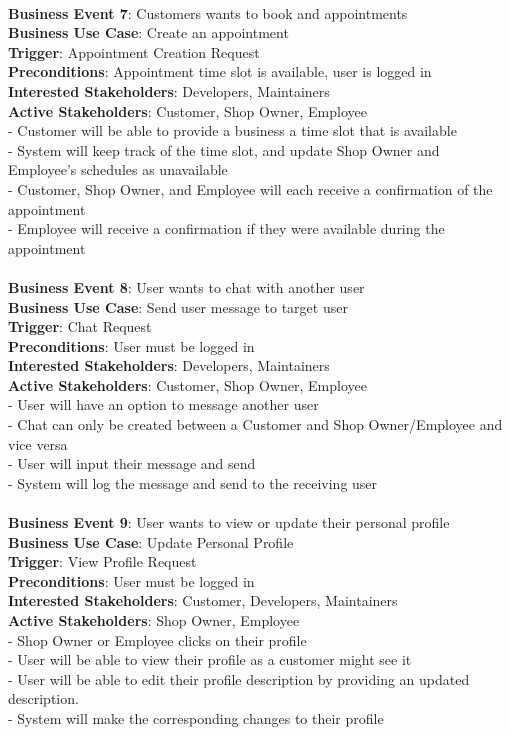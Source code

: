 \documentclass[12pt]{article}
\begin{document}
\\ \textbf{Business Event 7}: Customers wants to book and appointments
\\ \textbf{Business Use Case}: Create an appointment
\\ \textbf{Trigger}: Appointment Creation Request
\\ \textbf{Preconditions}: Appointment time slot is available, user is logged in
\\ \textbf{Interested Stakeholders}: Developers, Maintainers
\\ \textbf{Active Stakeholders}: Customer, Shop Owner, Employee
\\ - Customer will be able to provide a business a time slot that is available
\\ - System will keep track of the time slot, and update Shop Owner and Employee's schedules as unavailable
\\ - Customer, Shop Owner, and Employee will each receive a confirmation of the appointment
\\ - Employee will receive a confirmation if they were available during the appointment
\\

\\ \textbf{Business Event 8}: User wants to chat with another user
\\ \textbf{Business Use Case}: Send user message to target user
\\ \textbf{Trigger}: Chat Request
\\ \textbf{Preconditions}: User must be logged in
\\ \textbf{Interested Stakeholders}: Developers, Maintainers
\\ \textbf{Active Stakeholders}: Customer, Shop Owner, Employee
\\ - User will have an option to message another user
\\ - Chat can only be created between a Customer and Shop Owner/Employee and vice versa
\\ - User will input their message and send
\\ - System will log the message and send to the receiving user 
\\

\\ \textbf{Business Event 9}: User wants to view or update their personal profile
\\ \textbf{Business Use Case}: Update Personal Profile
\\ \textbf{Trigger}: View Profile Request
\\ \textbf{Preconditions}: User must be logged in
\\ \textbf{Interested Stakeholders}: Customer, Developers, Maintainers
\\ \textbf{Active Stakeholders}: Shop Owner, Employee
\\ - Shop Owner or Employee clicks on their profile
\\ - User will be able to view their profile as a customer might see it
\\ - User will be able to edit their profile description by providing an updated description.
\\ - System will make the corresponding changes to their profile
\end{document}
